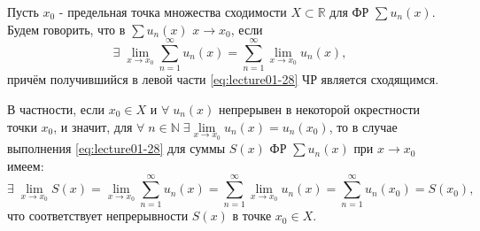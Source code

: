 \begin{col-answer-preambule}
Пусть $x_0$ - предельная точка множества сходимости $X \subset \mathbb{R}$ для ФР $\sum u_n(x)$.
Будем говорить, что в $\sum u_n(x)$  $x \to x_0$, если
\begin{equation}
\label{eq:lecture01-28}
\exists \; \lim\limits_{x \to x_0}\sum_{n = 1}^{\infty} u_n(x) = \sum_{n = 1}^{\infty} \lim_{x \to x_0} u_n(x),
\end{equation}
причём получившийся в левой части \eqref{eq:lecture01-28} ЧР является сходящимся.

В частности, если $x_0 \in X$ и $\forall \; u_n(x)$ непрерывен в некоторой окрестности точки $x_0$, и значит, \newline для $\forall \; n \in \mathbb{N} \; \exists \lim\limits_{x \to x_0} u_n(x) = u_n(x_0)$, то в случае выполнения \eqref{eq:lecture01-28} для суммы $S(x)$ ФР $\sum u_n(x)$ при $x \to x_0$ имеем:
\begin{equation}
\label{eq:lecture01-29}
\exists \; \lim\limits_{x \to x_0} S(x) = \lim\limits_{x \to x_0} \sum_{n=1}^{\infty} u_n(x) = \sum_{n=1}^{\infty} \lim\limits_{x \to x_0} u_n(x) = \sum_{n=1}^{\infty} u_n(x_0) = S(x_0),
\end{equation}
что соответствует непрерывности $S(x)$ в точке $x_0 \in X$.
\end{col-answer-preambule}

